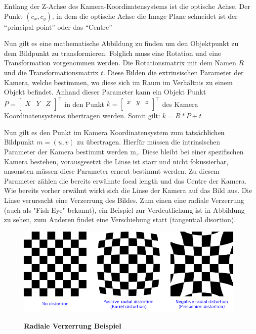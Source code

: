 Entlang der Z-Achse des Kamera-Koordinatensystems ist die optische Achse. Der Punkt $(c_x,c_y)$, in dem die optische Achse die Image Plane schneidet ist der "`principal point"' oder das "`Centre"' \autocite[8]{Medioni:2004:ETC:993884}

Nun gilt es eine mathematische Abbildung zu finden um den Objektpunkt zu dem Bildpunkt zu transformieren. Folglich muss eine Rotation und eine Transformation vorgenommen werden.
Die Rotationsmatrix mit dem Namen $R$ und die Transformationsmatrix $t$. Diese Bilden die extrinsischen Parameter der Kamera, welche bestimmen, wo diese sich im Raum im Verhältnis zu einem Objekt befindet. Anhand dieser Parameter kann ein  Objekt Punkt $P = \begin{bmatrix}X & Y& Z \\\end{bmatrix}^\intercal$ in den Punkt $ k = \begin{bmatrix}x & y& z \\\end{bmatrix}^\intercal$ des Kamera Koordinatensystems übertragen werden. Somit gilt: 
$k = R * P + t$ 

Nun gilt es den Punkt im Kamera Koordinatensystem zum tatsächlichen Bildpunkt $m=(u,v)$ zu übertragen. Hierfür müssen die intrinsischen Parameter der Kamera bestimmt werden m,. Diese bleibt bei einer spezifischen Kamera bestehen, vorausgesetzt die Linse ist starr und nicht fokussierbar, ansonsten müssen diese Parameter erneut bestimmt werden.
Zu diesem Parameter zählen die bereits erwähnte focal length und das Centre der Kamera. Wie bereits vorher erwähnt wirkt sich die Linse der Kamera auf das Bild aus. Die Linse verursacht eine Verzerrung des Bildes. Zum einen eine radiale Verzerrung (auch als "Fish Eye" bekannt), ein Beispiel zur Verdeutlichung ist in Abbildung  zu sehen, zum Anderen findet eine Verschiebung statt (tangential disortion).

\begin{figure}
\includegraphics[width=\textwidth]{media/distortion_examples}\\
\caption{\textbf{Radiale Verzerrung Beispiel \autocite{OpencvCamera2016}}
}
\label{Fig:radialdistortion}
\end{figure}

